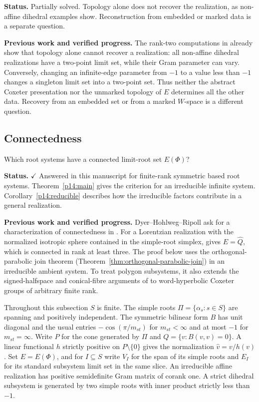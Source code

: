 \documentclass[11pt,reqno]{amsart}
\theoremstyle{plain}
\theoremstyle{definition}
\theoremstyle{remark}
\numberwithin{equation}{section}
\begin{document}
\par\medskip
\noindent\textbf{Status.} Partially solved. Topology alone does not recover the realization, as non-affine dihedral examples show. Reconstruction from embedded or marked data is a separate question.

\par\medskip
\noindent\textbf{Previous work and verified progress.}
The rank-two computations in \cite[Section~2.3]{HLR} already show
that topology alone cannot recover a realization: all non-affine dihedral
realizations have a two-point limit set, while their Gram parameter can
vary. Conversely, changing an infinite-edge parameter from $-1$ to a value
less than $-1$ changes a singleton limit set into a two-point set.
Thus neither the abstract Coxeter presentation nor the unmarked topology
of $E$ determines all the other data. Recovery from an embedded set or
from a marked $W$-space is a different question.

\subsection{Connectedness}\label{p14:connectedness}
Which root systems have a connected limit-root set $E(\Phi)$?

\par\medskip
\noindent\textbf{Status.} \(\checkmark\) Answered in this manuscript for
finite-rank symmetric based root systems. Theorem~\ref{p14:main} gives the
criterion for an irreducible infinite system.
Corollary~\ref{p14:reducible} describes how the irreducible factors
contribute in a general realization.

\par\medskip
\noindent\textbf{Previous work and verified progress.}
Dyer--Hohlweg--Ripoll ask for a characterization of connectedness in
\cite[Section~7.1]{DHR}. For a Lorentzian realization with the
normalized isotropic sphere contained in the simple-root simplex,
\cite[Theorem~1.2(a)]{HMN2019} gives $E=\widehat Q$, which is connected
in rank at least three. The proof below uses the orthogonal-parabolic
join theorem (Theorem~\ref{thm:orthogonal-parabolic-join}) in an
irreducible ambient system. To treat polygon subsystems, it also extends
the signed-halfspace and conical-fibre arguments of
\cite[Section~3]{WangUniqueness} to word-hyperbolic Coxeter groups of
arbitrary finite rank.

Throughout this subsection $S$ is finite. The simple roots
$\Pi=\{\alpha_s:s\in S\}$ are spanning and positively independent.
The symmetric bilinear form $B$ has unit diagonal and the usual
entries $-\cos(\pi/m_{st})$ for $m_{st}<\infty$ and at most $-1$
for $m_{st}=\infty$. Write $P$ for the cone generated by $\Pi$ and
$Q=\{v:B(v,v)=0\}$. A linear functional $h$ strictly positive on
$P\setminus\{0\}$ gives the normalization $\widehat v=v/h(v)$.
Set $E=E(\Phi)$, and for $I\subseteq S$ write $V_I$ for the span of
its simple roots and $E_I$ for its standard subsystem limit set in the
same slice. An irreducible affine realization has positive semidefinite
Gram matrix of corank one. A strict dihedral subsystem is generated
by two simple roots with inner product strictly less than $-1$.
\end{document}

